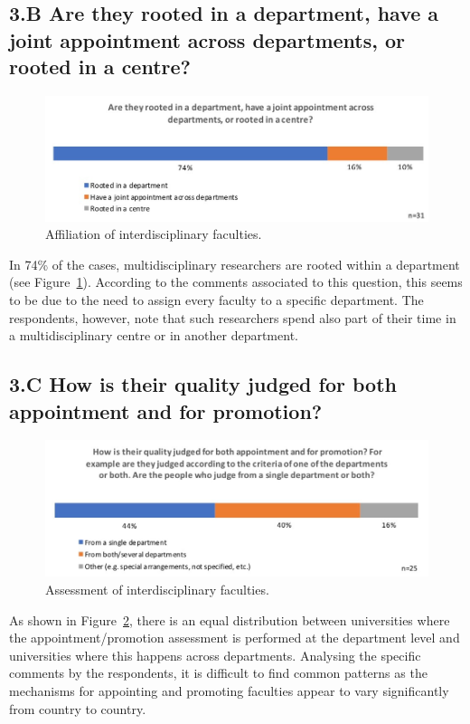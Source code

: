 \subsection{3.B Are they rooted in a department, have a joint appointment
  across departments, or rooted in a centre?}

\begin{figure}\label{sect3:affiliation}
\centering
\includegraphics[width = \linewidth]{charts/3b.jpg}
\caption{Affiliation of interdisciplinary faculties.}
\end{figure}

In 74\% of the cases, multidisciplinary researchers are rooted within
a department (see Figure~\ref{sect3:affiliation}). According to the comments associated to this question,
this seems to be due to the need to assign every faculty to a specific
department. The respondents, however, note that such researchers spend
also part of their time in a multidisciplinary centre or in another
department. 

\subsection{3.C How is their quality judged for both appointment and for
  promotion?}

\begin{figure}\label{sect3:assessment}
\centering
\includegraphics[width = \linewidth]{charts/3c.jpg}
\caption{Assessment of interdisciplinary faculties.}
\end{figure}

As shown in Figure~\ref{sect3:assessment}, there is an equal distribution between universities
where the appointment/promotion assessment is performed at the
department level and universities where this happens across
departments. Analysing the specific comments by the respondents, it is
difficult to find common patterns as the mechanisms for appointing and
promoting faculties appear to vary significantly from country to
country. 


